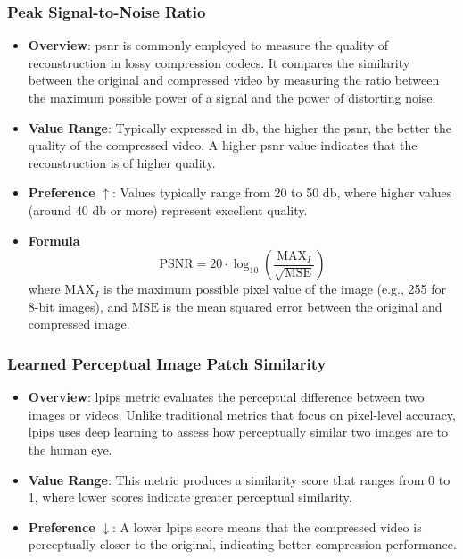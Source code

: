 \documentclass{ioereport}
\begin{document}
        \subsubsection{Peak Signal-to-Noise Ratio}
            \begin{itemize}
                \item \textbf{Overview}: \gls{psnr} is commonly employed to measure the quality of reconstruction in lossy compression \gls{codec}s. It compares the similarity between the original and compressed video by measuring the ratio between the maximum possible power of a signal and the power of distorting noise.
                \item \textbf{Value Range}: Typically expressed in \gls{db}, the higher the \gls{psnr}, the better the quality of the compressed video. A higher \gls{psnr} value indicates that the reconstruction is of higher quality.
                \item \textbf{Preference} $\uparrow$: Values typically range from 20 to 50 \gls{db}, where higher values (around 40 \gls{db} or more) represent excellent quality.
                \item \textbf{Formula}
                \begin{equation}\label{eqn:PSNR}
                    \text{PSNR} = 20 \cdot \log_{10}\left(\frac{{\text{MAX}_I}}{\sqrt{\text{MSE}}}\right)
                \end{equation}
                where $\text{MAX}_I$ is the maximum possible pixel value of the image (e.g., 255 for 8-bit images), and $\text{MSE}$ is the mean squared error between the original and compressed image.
               \end{itemize} 
           
        \subsubsection{Learned Perceptual Image Patch Similarity}
            \begin{itemize}
                \item \textbf{Overview}: \gls{lpips} metric evaluates the perceptual difference between two images or videos. Unlike traditional metrics that focus on pixel-level accuracy, \gls{lpips} uses deep learning to assess how perceptually similar two images are to the human eye.
                \item \textbf{Value Range}: This metric produces a similarity score that ranges from 0 to 1, where lower scores indicate greater perceptual similarity.
                \item \textbf{Preference} $\downarrow$: A lower \gls{lpips} score means that the compressed video is perceptually closer to the original, indicating better compression performance.
            \end{itemize}
\end{document}

